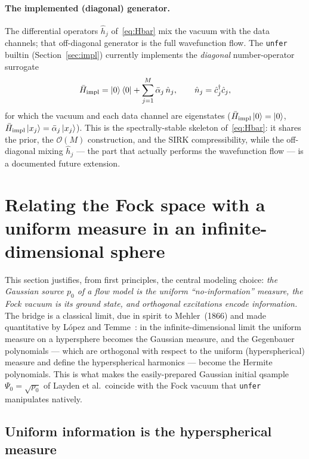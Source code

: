 \documentclass[11pt, a4paper]{article}
\begin{document}
\paragraph{The implemented (diagonal) generator.}
The differential operators $\hat h_j$ of~\eqref{eq:Hbar} mix the vacuum with
the data channels; that off-diagonal generator is the full wavefunction flow.
The \texttt{unfer} builtin (Section~\ref{sec:impl}) currently implements the
\emph{diagonal} number-operator surrogate
\begin{equation}
  \bar H_{\text{impl}}=\ket{0}\bra{0}+\sum_{j=1}^M\bar\alpha_j\,\hat n_j,
  \qquad \hat n_j=\hat c_j^\dagger\hat c_j ,
  \label{eq:Hdiag}
\end{equation}
for which the vacuum and each data channel are eigenstates
($\bar H_{\text{impl}}\ket{0}=\ket{0}$,
$\bar H_{\text{impl}}\ket{x_j}=\bar\alpha_j\ket{x_j}$). This is the
spectrally-stable skeleton of~\eqref{eq:Hbar}: it shares the prior, the
$\mathcal{O}(M)$ construction, and the SIRK compressibility, while the
off-diagonal mixing $\hat h_j$ --- the part that actually performs the
wavefunction flow --- is a documented future extension.

\section{Relating the Fock space with a uniform measure in an
infinite-dimensional sphere}
\label{sec:mehler}

This section justifies, from first principles, the central modeling choice:
\emph{the Gaussian source $p_0$ of a flow model is the uniform
``no-information'' measure, the Fock vacuum is its ground state, and orthogonal
excitations encode information.} The bridge is a classical limit, due in spirit
to Mehler~(1866) and made quantitative by L\'opez and
Temme~\cite{LopezTemme1999}: in the infinite-dimensional limit the uniform
measure on a hypersphere becomes the Gaussian measure, and the Gegenbauer
polynomials --- which are orthogonal with respect to the uniform
(hyperspherical) measure and define the hyperspherical harmonics --- become
the Hermite polynomials. This is what makes the easily-prepared Gaussian
initial qsample $\Psi_0=\sqrt{p_0}$ of Layden et al.\ coincide with the Fock
vacuum that \texttt{unfer} manipulates natively.

\subsection{Uniform information is the hyperspherical measure}
\end{document}
